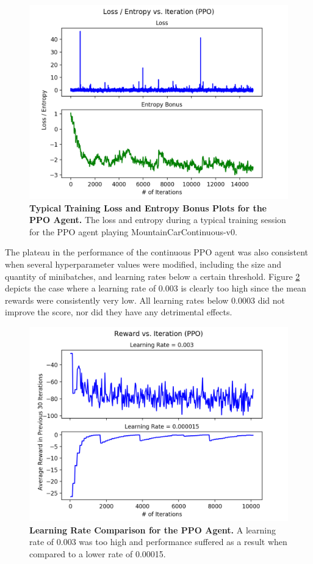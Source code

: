 \documentclass[conference]{IEEEtran}
\begin{document}
\begin{figure}[htbp]
\centerline{\includegraphics[scale=0.5]{PPO_Train_Loss_Entropy_Plot_MCC_Typical.png}}
\caption{\textbf{Typical Training Loss and Entropy Bonus Plots for the PPO Agent.}  The loss and entropy during a typical training session for the PPO agent playing MountainCarContinuous-v0.}
\label{fig:PPOTypicalTrainLossEntropyMCC}
\end{figure}

The plateau in the performance of the continuous PPO agent was also consistent when several hyperparameter values were modified, including the size and quantity of minibatches, and learning rates below a certain threshold. Figure \ref{fig:PPOLRComparedMCC} depicts the case where a learning rate of 0.003 is clearly too high since the mean rewards were consistently very low. All learning rates below 0.0003 did not improve the score, nor did they have any detrimental effects.

\begin{figure}[htbp]
\centerline{\includegraphics[scale=0.5]{PPO_Train_Reward_Plot_MCC_LRCompare.png}}
\caption{\textbf{Learning Rate Comparison for the PPO Agent.}  A learning rate of 0.003 was too high and performance suffered as a result when compared to a lower rate of 0.00015.}
\label{fig:PPOLRComparedMCC}
\end{figure}
\end{document}
